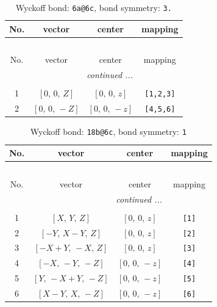 \documentclass[fleqn,8pt]{jsarticle}
\begin{document}
\begin{longtable}{cccc}
\caption{Wyckoff bond: {\tt 6a@6c}, bond symmetry: {\tt 3.}}
 \\
 \hline \hline
No. & vector & center & mapping \\ \hline \endfirsthead

\multicolumn{3}{l}{\tablename\ \thetable{}} \\
 \hline \hline
No. & vector & center & mapping \\ \hline \endhead

 \hline \hline
\multicolumn{3}{r}{\footnotesize\it continued ...} \\ \endfoot

 \hline \hline
\multicolumn{3}{r}{} \\ \endlastfoot

1 & $\left[ 0,\, 0,\, Z \right]$ & $\left[ 0,\, 0,\, z \right]$ & {\tt [1,2,3]} \\ \hline
2 & $\left[ 0,\, 0,\, - Z \right]$ & $\left[ 0,\, 0,\, - z \right]$ & {\tt [4,5,6]} \\
\end{longtable}
\renewcommand{\arraystretch}{1.2}
\begin{longtable}{cccc}
\caption{Wyckoff bond: {\tt 18b@6c}, bond symmetry: {\tt 1}}
 \\
 \hline \hline
No. & vector & center & mapping \\ \hline \endfirsthead

\multicolumn{3}{l}{\tablename\ \thetable{}} \\
 \hline \hline
No. & vector & center & mapping \\ \hline \endhead

 \hline \hline
\multicolumn{3}{r}{\footnotesize\it continued ...} \\ \endfoot

 \hline \hline
\multicolumn{3}{r}{} \\ \endlastfoot

1 & $\left[ X,\, Y,\, Z \right]$ & $\left[ 0,\, 0,\, z \right]$ & {\tt [1]} \\ \hline
2 & $\left[ - Y,\, X - Y,\, Z \right]$ & $\left[ 0,\, 0,\, z \right]$ & {\tt [2]} \\ \hline
3 & $\left[ - X + Y,\, - X,\, Z \right]$ & $\left[ 0,\, 0,\, z \right]$ & {\tt [3]} \\ \hline
4 & $\left[ - X,\, - Y,\, - Z \right]$ & $\left[ 0,\, 0,\, - z \right]$ & {\tt [4]} \\ \hline
5 & $\left[ Y,\, - X + Y,\, - Z \right]$ & $\left[ 0,\, 0,\, - z \right]$ & {\tt [5]} \\ \hline
6 & $\left[ X - Y,\, X,\, - Z \right]$ & $\left[ 0,\, 0,\, - z \right]$ & {\tt [6]} \\
\end{longtable}
\end{document}
